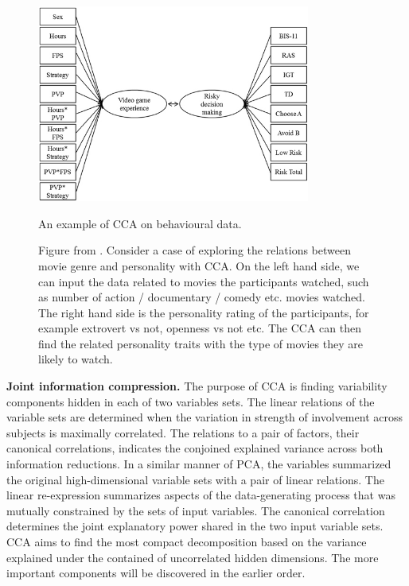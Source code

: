 \begin{figure}[H]
    \vspace{-10pt}
    \centering
    \includegraphics[width=0.8\textwidth]{cca/image/ccafig1.jpg}
	\caption{An example of CCA on behavioural data.}
	\linespacesmall
	\footnotesize
	\caption*{Figure from . Consider a case of exploring the relations between movie genre and personality with CCA. On the left hand side, we can input the data related to movies the participants watched, such as number of action / documentary / comedy etc. movies watched. The right hand side is the personality rating of the participants, for example extrovert vs not, openness vs not etc. The CCA can then find the related personality traits with the type of movies they are likely to watch.}
    \linespacenormal
	\label{fig:methods:fig1}
	\vspace{-20pt}
\end{figure}


\textbf{Joint information compression.} The purpose of CCA is finding variability components hidden in each of two variables sets.  The linear relations of the variable sets are determined when the variation in strength of involvement across subjects is maximally correlated. The relations to a pair of factors, their canonical correlations, indicates the conjoined explained variance across both information reductions. In a similar manner of PCA, the variables summarized the original high-dimensional variable sets with a pair of linear relations. The linear re-expression summarizes aspects of the data-generating process that was mutually constrained by the sets of input variables. The canonical correlation determines the joint explanatory power shared in the two input variable sets. CCA aims to find the most compact decomposition based on the variance explained under the contained of uncorrelated hidden dimensions. The more important components will be discovered in the earlier order.

